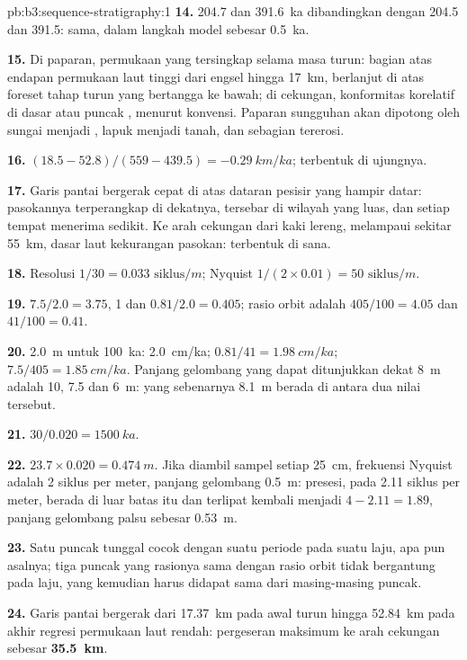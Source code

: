 \begin{solution}{pb:b3:sequence-stratigraphy:1}
\textbf{14.} 204.7 dan \qty{391.6}{ka} dibandingkan dengan 204.5 dan 391.5: sama,
dalam langkah model sebesar \qty{0.5}{ka}.

\textbf{15.} Di paparan, permukaan yang tersingkap selama masa turun: bagian atas
endapan permukaan laut tinggi dari engsel hingga \qty{17}{km}, berlanjut di atas
foreset tahap turun yang bertangga ke bawah; di cekungan, konformitas
korelatif di dasar atau puncak , menurut konvensi. Paparan
sungguhan akan dipotong oleh sungai menjadi , lapuk menjadi tanah,
dan sebagian tererosi.

\textbf{16.} $(18.5 - 52.8)/(559 - 439.5) = \qty{-0.29}{km/ka}$; 
terbentuk di ujungnya.

\textbf{17.} Garis pantai bergerak cepat di atas dataran pesisir yang hampir datar:
pasokannya terperangkap di dekatnya, tersebar di wilayah yang luas, dan setiap tempat
menerima sedikit. Ke arah cekungan dari kaki lereng, melampaui sekitar \qty{55}{km}, dasar laut
kekurangan pasokan:  terbentuk di sana.

\textbf{18.} Resolusi $1/30 = \num{0.033}\text{ siklus}/\unit{m}$; Nyquist $1/(2\times
0.01) = \num{50}\text{ siklus}/\unit{m}$.

\textbf{19.} $7.5/2.0 = 3.75$, 1 dan $0.81/2.0 = 0.405$; rasio orbit
adalah $405/100 = 4.05$ dan $41/100 = 0.41$.

\textbf{20.} \qty{2.0}{m} untuk \qty{100}{ka}: \qty{2.0}{cm/ka}; $0.81/41 =
\qty{1.98}{cm/ka}$; $7.5/405 = \qty{1.85}{cm/ka}$. Panjang gelombang yang
dapat ditunjukkan  dekat \qty{8}{m} adalah 10, 7.5 dan \qty{6}{m}: yang
sebenarnya \qty{8.1}{m} berada di antara dua nilai tersebut.

\textbf{21.} $30/0.020 = \qty{1500}{ka}$.

\textbf{22.} $23.7\times0.020 = \qty{0.474}{m}$. Jika diambil sampel setiap
\qty{25}{cm}, frekuensi Nyquist adalah 2 siklus per meter, panjang gelombang
\qty{0.5}{m}: presesi, pada 2.11 siklus per meter, berada di luar batas itu dan
terlipat kembali menjadi $4 - 2.11 = 1.89$, panjang gelombang palsu sebesar \qty{0.53}{m}.

\textbf{23.} Satu puncak tunggal cocok dengan suatu periode pada suatu laju, apa pun
asalnya; tiga puncak yang rasionya sama dengan rasio orbit tidak bergantung pada
laju, yang kemudian harus didapat sama dari masing-masing puncak.

\textbf{24.} Garis pantai bergerak dari \qty{17.37}{km} pada awal
turun hingga \qty{52.84}{km} pada akhir regresi permukaan laut rendah: pergeseran maksimum
ke arah cekungan sebesar \textbf{\qty[text-series-to-math=true]{35.5}{km}}.
\end{solution}

